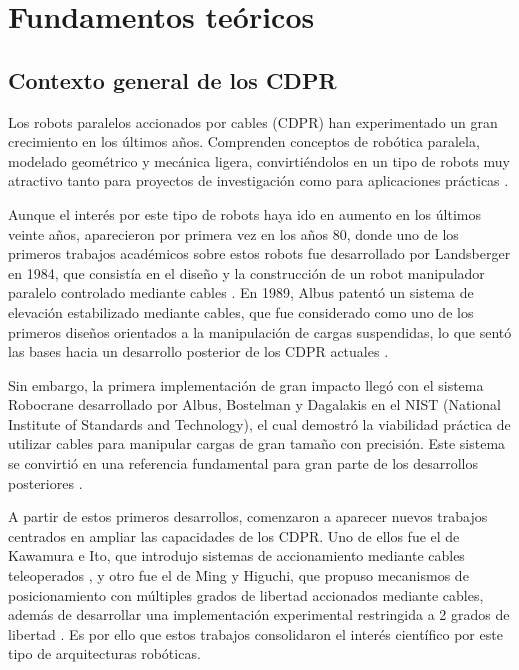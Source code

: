 \chapter{Fundamentos teóricos}
\label{cap:capitulo2}

\section{Contexto general de los CDPR}
\label{sec:segundaseccion}

Los robots paralelos accionados por cables (CDPR) han experimentado un gran crecimiento en los últimos años. Comprenden conceptos de robótica paralela, modelado geométrico y mecánica ligera, convirtiéndolos en un tipo de robots muy atractivo tanto para proyectos de investigación como para aplicaciones prácticas \cite{pott2018cdpr,merlet2006parallel,lau2025cdpr}.

\vspace{0.25cm}

Aunque el interés por este tipo de robots haya ido en aumento en los últimos veinte años, aparecieron por primera vez en los años 80, donde uno de los primeros trabajos académicos sobre estos robots fue desarrollado por Landsberger en 1984, que consistía en el diseño y la construcción de un robot manipulador paralelo controlado mediante cables \cite{landsberger1984}. En 1989, Albus patentó un sistema de elevación estabilizado mediante cables, que fue considerado como uno de los primeros diseños orientados a la manipulación de cargas suspendidas, lo que sentó las bases hacia un desarrollo posterior de los CDPR actuales \cite{albus1989patent}.

\vspace{0.25cm}

Sin embargo, la primera implementación de gran impacto llegó con el sistema Robocrane desarrollado por Albus, Bostelman y Dagalakis en el NIST (National Institute of Standards and Technology), el cual demostró la viabilidad práctica de utilizar cables para manipular cargas de gran tamaño con precisión. Este sistema se convirtió en una referencia fundamental para gran parte de los desarrollos posteriores \cite{albus1992robocrane}.

\vspace{0.25cm}

A partir de estos primeros desarrollos, comenzaron a aparecer nuevos trabajos centrados en ampliar las capacidades de los CDPR. Uno de ellos fue el de Kawamura e Ito, que introdujo sistemas de accionamiento mediante cables teleoperados \cite{kawamura1993}, y otro fue el de Ming y Higuchi, que propuso mecanismos de posicionamiento con múltiples grados de libertad accionados mediante cables, además de desarrollar una implementación experimental restringida a 2 grados de libertad \cite{ming1994part1,ming1994part2}. Es por ello que estos trabajos consolidaron el interés científico por este tipo de arquitecturas robóticas.

